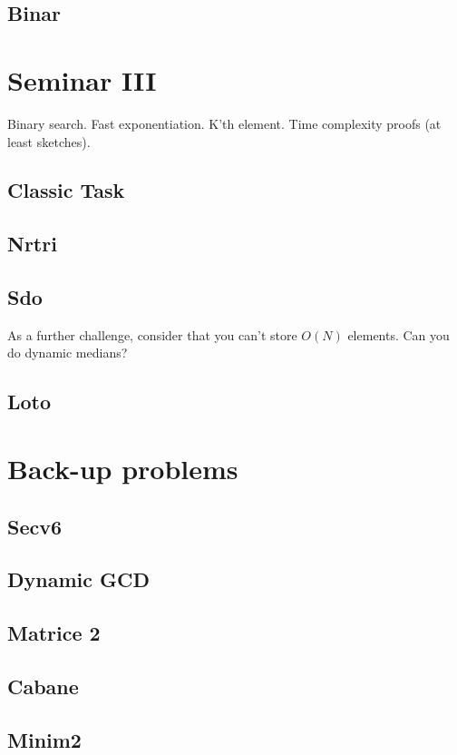 \documentclass{llncs}
\begin{document}
\subsection{Binar \cite{website:infoarena/binar}}


\section{Seminar III}

Binary search. Fast exponentiation. K'th element. Time complexity proofs (at least sketches).

\subsection{Classic Task \cite{website:infoarena/classictask}}
\subsection{Nrtri \cite{website:infoarena/nrtri}}
\subsection{Sdo \cite{website:infoarena/sdo}}
	As a further challenge, consider that you can't store $O(N)$ elements. Can you do dynamic medians?
\subsection{Loto \cite{website:infoarena/loto}}

%
%
%

\section{Back-up problems}

\subsection{Secv6 \cite{website:infoarena/secv6}}
\subsection{Dynamic GCD \cite{website:timus/gcd}}
\subsection{Matrice 2 \cite{website:infoarena/matrice2}}
\subsection{Cabane \cite{website:infoarena/cabane}}
\subsection{Minim2 \cite{website:infoarena/minim2}}


\clearpage


\end{document}
